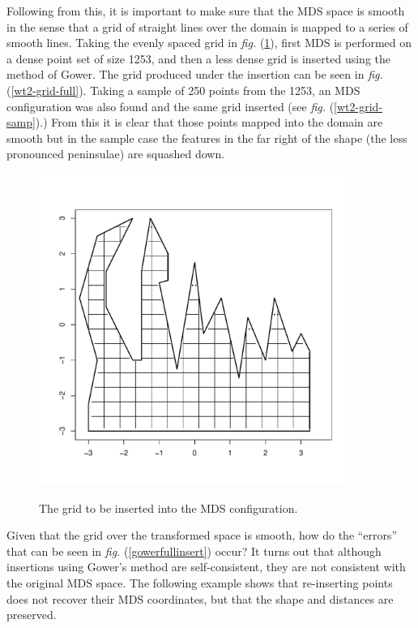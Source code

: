 \documentclass[a4paper,10pt]{article}
\newcommand{\fig}[1]{\emph{fig.} (\ref{#1})}
\begin{document}
Following from this, it is important to make sure that the MDS space is smooth in the sense that a grid of straight lines over the domain is mapped to a series of smooth lines. Taking the evenly spaced grid in \fig{wt2-grid-orig}, first MDS is performed on a dense point set of size 1253, and then a less dense grid is inserted using the method of Gower. The grid produced under the insertion can be seen in \fig{wt2-grid-full}. Taking a sample of 250 points from the 1253, an MDS configuration was also found and the same grid inserted (see \fig{wt2-grid-samp}.) From this it is clear that those points mapped into the domain are smooth but in the sample case the features in the far right of the shape (the less pronounced peninsulae) are squashed down.



\begin{figure}
\centering
\includegraphics[width=4in]{figs/wt2-grid-orig.pdf} \\
\caption{The grid to be inserted into the MDS configuration.}
\label{wt2-grid-orig}
\end{figure}

Given that the grid over the transformed space is smooth, how do the ``errors'' that can be seen in \fig{gowerfullinsert} occur? It turns out that although insertions using Gower's method are self-consistent, they are not consistent with the original MDS space. The following example shows that re-inserting points does not recover their MDS coordinates, but that the shape and distances are preserved.
\end{document}
